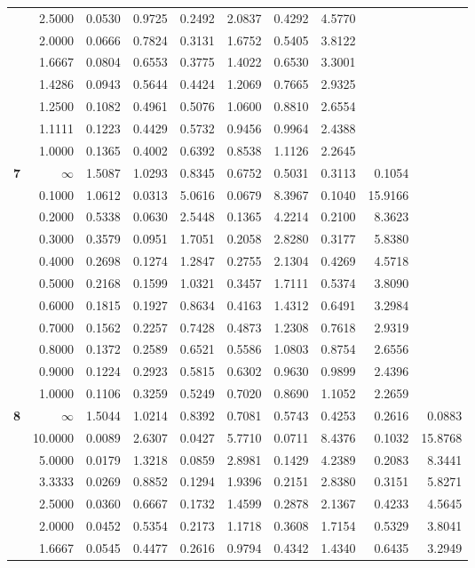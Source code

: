 \begin{table}[!htb]
\begin{center}
{\begin{tabular}{|c||r|r|r|r|r|r|r|r|r|}
&2.5000&0.0530&0.9725&0.2492&2.0837&0.4292&4.5770&     &     \\
&2.0000&0.0666&0.7824&0.3131&1.6752&0.5405&3.8122&     &     \\
&1.6667&0.0804&0.6553&0.3775&1.4022&0.6530&3.3001&     &     \\
&1.4286&0.0943&0.5644&0.4424&1.2069&0.7665&2.9325&     &     \\
&1.2500&0.1082&0.4961&0.5076&1.0600&0.8810&2.6554&     &     \\
&1.1111&0.1223&0.4429&0.5732&0.9456&0.9964&2.4388&     &     \\
&1.0000&0.1365&0.4002&0.6392&0.8538&1.1126&2.2645&     &     \\ \hline
\textbf{ 7}&$\infty$&1.5087&1.0293&0.8345&0.6752&0.5031&0.3113&0.1054&     \\
&0.1000&1.0612&0.0313&5.0616&0.0679&8.3967&0.1040&15.9166&     \\
&0.2000&0.5338&0.0630&2.5448&0.1365&4.2214&0.2100&8.3623&     \\
&0.3000&0.3579&0.0951&1.7051&0.2058&2.8280&0.3177&5.8380&     \\
&0.4000&0.2698&0.1274&1.2847&0.2755&2.1304&0.4269&4.5718&     \\
&0.5000&0.2168&0.1599&1.0321&0.3457&1.7111&0.5374&3.8090&     \\
&0.6000&0.1815&0.1927&0.8634&0.4163&1.4312&0.6491&3.2984&     \\
&0.7000&0.1562&0.2257&0.7428&0.4873&1.2308&0.7618&2.9319&     \\
&0.8000&0.1372&0.2589&0.6521&0.5586&1.0803&0.8754&2.6556&     \\
&0.9000&0.1224&0.2923&0.5815&0.6302&0.9630&0.9899&2.4396&     \\
&1.0000&0.1106&0.3259&0.5249&0.7020&0.8690&1.1052&2.2659&     \\ \hline
\textbf{ 8}&$\infty$&1.5044&1.0214&0.8392&0.7081&0.5743&0.4253&0.2616&0.0883\\
&10.0000&0.0089&2.6307&0.0427&5.7710&0.0711&8.4376&0.1032&15.8768\\
&5.0000&0.0179&1.3218&0.0859&2.8981&0.1429&4.2389&0.2083&8.3441\\
&3.3333&0.0269&0.8852&0.1294&1.9396&0.2151&2.8380&0.3151&5.8271\\
&2.5000&0.0360&0.6667&0.1732&1.4599&0.2878&2.1367&0.4233&4.5645\\
&2.0000&0.0452&0.5354&0.2173&1.1718&0.3608&1.7154&0.5329&3.8041\\
&1.6667&0.0545&0.4477&0.2616&0.9794&0.4342&1.4340&0.6435&3.2949\\

\end{tabular}}
\end{center}
\end{table}
